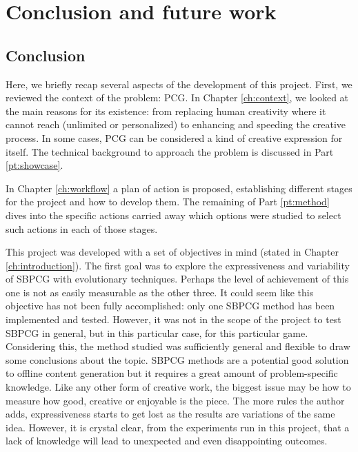 \chapter{Conclusion and future work}\label{ch:Conclusion}
\section{Conclusion}

Here, we briefly recap several aspects of the development of this project. First, we reviewed the context of the problem: \acf{PCG}. In Chapter \ref{ch:context}, we looked at the main reasons for its existence: from replacing human creativity where it cannot reach (unlimited or personalized) to enhancing and speeding the creative process. In some cases, \acs{PCG} can  be considered a kind of creative expression for itself. The technical background to approach the problem is discussed in Part \ref{pt:showcase}.

In Chapter \ref{ch:workflow} a plan of action is proposed, establishing different stages for the project and how to develop them. The remaining of Part \ref{pt:method} dives into the specific actions carried away which options were studied to select such actions in each of those stages.

This project was developed with a set of objectives in mind (stated in Chapter \ref{ch:introduction}). The first goal was to explore the expressiveness and variability of \acf{SBPCG} with evolutionary techniques. Perhaps the level of achievement of this one is not as easily measurable as the other three. It could seem like this objective has not been fully accomplished: only one \acs{SBPCG} method has been implemented and tested. However, it was not in the scope of the project to test \acs{SBPCG} in general, but in this particular case, for this particular game. Considering this, the method studied was sufficiently general and flexible to draw some conclusions about the topic. \acs{SBPCG} methods are a potential good solution to offline content generation but it requires a great amount of problem-specific knowledge. Like any other form of creative work, the biggest issue may be how to measure how good, creative or enjoyable is the piece. The more rules the author adds, expressiveness starts to get lost as the results are variations of the same idea. However, it is crystal clear, from the experiments run in this project, that a lack of knowledge will lead to unexpected and even disappointing outcomes.

